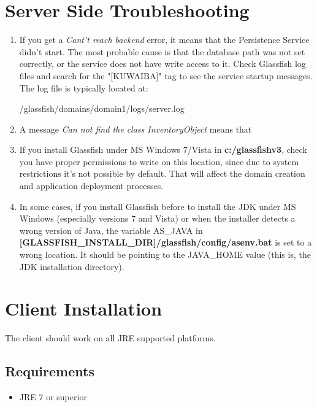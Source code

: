 \documentclass[a4paper]{article}
\begin{document}
			\newpage
			\section{Server Side Troubleshooting} \label{sec:Troubleshooting}
				\begin{enumerate}
					\item If you get a \textit{Cant't reach backend} error, it means that the Persistence Service didn't start. The most probable cause is that the database path was not set correctly, or the service does not have write access to it. Check Glassfish log files and search for the "[KUWAIBA]" tag to see the service startup messages. The log file is typically located at:
					\begin{verbbox}
						/glassfish/domains/domain1/logs/server.log
					\end{verbbox}
					\begin{figure}[h!]
						\centering	
						\theverbbox
					\end{figure}					
					\item A message \textit{Can not find the class InventoryObject} means that 
					\item If you install Glassfish under MS Windows 7/Vista in \textbf{c:/glassfishv3}, check you have proper permissions to write on this location, since due to system restrictions it's not possible by default. That will affect the domain creation and application deployment processes.
					\item In some cases, if you install Glassfish before to install the JDK under MS Windows (especially versions 7 and Vista) or when the installer detects a wrong version of Java, the variable AS\_JAVA in \textbf{[GLASSFISH\_INSTALL\_DIR]/glassfish/config/asenv.bat} is set to a wrong location. It should be pointing to the JAVA\_HOME value (this is, the JDK installation directory).
				\end{enumerate}
			\newpage
			\section{Client Installation}
				The client should work on all JRE supported platforms.
				\subsection{Requirements}
					\begin{itemize}
						\item JRE 7 or superior
					\end{itemize}
			
\end{document}
